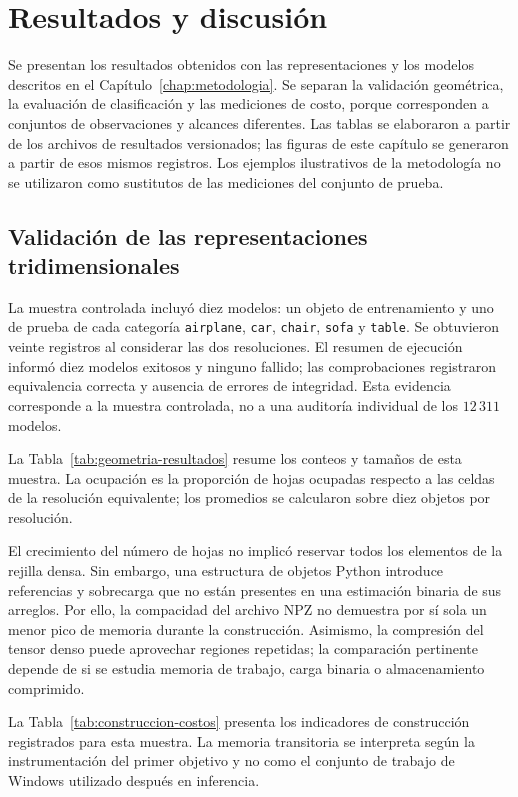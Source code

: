 \chapter{Resultados y discusión}
\label{chap:resultados}
Se presentan los resultados obtenidos con las representaciones y los modelos descritos en el Capítulo~\ref{chap:metodologia}. Se separan la validación geométrica, la evaluación de clasificación y las mediciones de costo, porque corresponden a conjuntos de observaciones y alcances diferentes. Las tablas se elaboraron a partir de los archivos de resultados versionados; las figuras de este capítulo se generaron a partir de esos mismos registros. Los ejemplos ilustrativos de la metodología no se utilizaron como sustitutos de las mediciones del conjunto de prueba.

\section{Validación de las representaciones tridimensionales}
\label{sec:resultados-representaciones}
La muestra controlada incluyó diez modelos: un objeto de entrenamiento y uno de prueba de cada categoría \texttt{airplane}, \texttt{car}, \texttt{chair}, \texttt{sofa} y \texttt{table}. Se obtuvieron veinte registros al considerar las dos resoluciones. El resumen de ejecución informó diez modelos exitosos y ninguno fallido; las comprobaciones registraron equivalencia correcta y ausencia de errores de integridad. Esta evidencia corresponde a la muestra controlada, no a una auditoría individual de los $12\,311$ modelos.

La Tabla~\ref{tab:geometria-resultados} resume los conteos y tamaños de esta muestra. La ocupación es la proporción de hojas ocupadas respecto a las celdas de la resolución equivalente; los promedios se calcularon sobre diez objetos por resolución.


El crecimiento del número de hojas no implicó reservar todos los elementos de la rejilla densa. Sin embargo, una estructura de objetos Python introduce referencias y sobrecarga que no están presentes en una estimación binaria de sus arreglos. Por ello, la compacidad del archivo NPZ no demuestra por sí sola un menor pico de memoria durante la construcción. Asimismo, la compresión del tensor denso puede aprovechar regiones repetidas; la comparación pertinente depende de si se estudia memoria de trabajo, carga binaria o almacenamiento comprimido.

La Tabla~\ref{tab:construccion-costos} presenta los indicadores de construcción registrados para esta muestra. La memoria transitoria se interpreta según la instrumentación del primer objetivo y no como el conjunto de trabajo de Windows utilizado después en inferencia.


